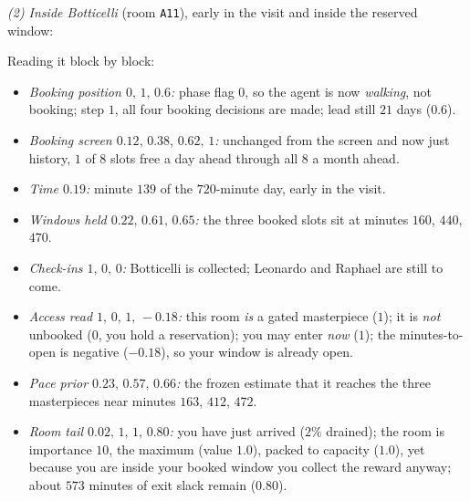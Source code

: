\documentclass[11pt]{article}
\begin{document}
\emph{(2) Inside Botticelli} (room \texttt{A11}), early in the visit and inside the reserved window:
\begin{center}\footnotesize\ttfamily
[0, 1, 0.6; 0.12, 0.38, 0.62, 1; 0.19; 0.22, 0.61, 0.65; 1,0,0; 1,0,1,-0.18; 0.23,0.57,0.66; 0.02, 1, 1, 0.80]
\end{center}
Reading it block by block:
\begin{itemize}\setlength\itemsep{0.15em}
\item \emph{Booking position $0,\,1,\,0.6$:} phase flag $0$, so the agent is now \emph{walking}, not
booking; step $1$, all four booking decisions are made; lead still $21$ days ($0.6$).
\item \emph{Booking screen $0.12,\,0.38,\,0.62,\,1$:} unchanged from the screen and now just history, $1$
of $8$ slots free a day ahead through all $8$ a month ahead.
\item \emph{Time $0.19$:} minute $139$ of the $720$-minute day, early in the visit.
\item \emph{Windows held $0.22,\,0.61,\,0.65$:} the three booked slots sit at minutes $160$, $440$, $470$.
\item \emph{Check-ins $1,\,0,\,0$:} Botticelli is collected; Leonardo and Raphael are still to come.
\item \emph{Access read $1,\,0,\,1,\,-0.18$:} this room \emph{is} a gated masterpiece ($1$); it is
\emph{not} unbooked ($0$, you hold a reservation); you may enter \emph{now} ($1$); the minutes-to-open
is negative ($-0.18$), so your window is already open.
\item \emph{Pace prior $0.23,\,0.57,\,0.66$:} the frozen estimate that it reaches the three masterpieces
near minutes $163$, $412$, $472$.
\item \emph{Room tail $0.02,\,1,\,1,\,0.80$:} you have just arrived ($2\%$ drained); the room is
importance $10$, the maximum (value $1.0$), packed to capacity ($1.0$), yet because you are inside your
booked window you collect the reward anyway; about $573$ minutes of exit slack remain ($0.80$).
\end{itemize}
\end{document}
